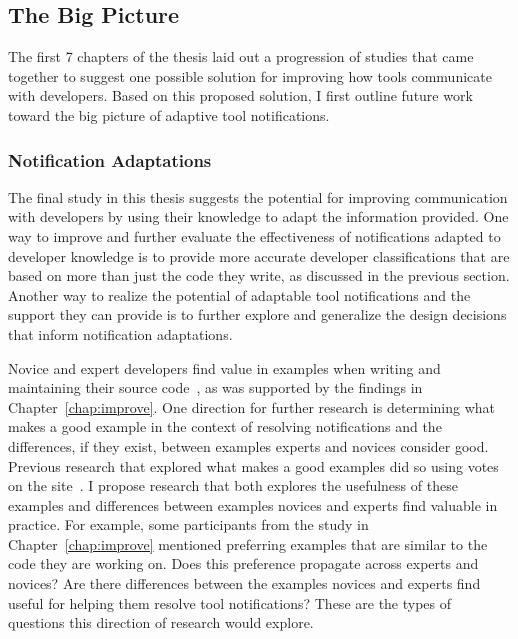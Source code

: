 \subsection{The Big Picture}
The first 7 chapters of the thesis laid out a progression of studies that came together to suggest one possible solution for improving how tools communicate with developers. Based on this proposed solution, I first outline future work toward the big picture of adaptive tool notifications.

\subsubsection{Notification Adaptations}
The final study in this thesis suggests the potential for improving communication with developers by using their knowledge to adapt the information provided. One way to improve and further evaluate the effectiveness of notifications adapted to developer knowledge is to provide more accurate developer classifications that are based on more than just the code they write, as discussed in the previous section. Another way to realize the potential of adaptable tool notifications and the support they can provide is to further explore and generalize the design decisions that inform notification adaptations.

Novice and expert developers find value in examples when writing and maintaining their source code~\cite{nasehi2012makes}, as was supported by the findings in Chapter~\ref{chap:improve}. One direction for further research is determining what makes a good example in the context of resolving notifications and the differences, if they exist, between examples experts and novices consider good. Previous research that explored what makes a good examples did so using votes on the site~\cite{nasehi2012makes}. I propose research that both explores the usefulness of these examples and differences between examples novices and experts find valuable in practice. For example, some participants from the study in Chapter~\ref{chap:improve} mentioned preferring examples that are similar to the code they are working on. Does this preference propagate across experts and novices? Are there differences between the examples novices and experts find useful for helping them resolve tool notifications? These are the types of questions this direction of research would explore.

